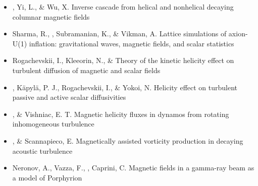 \begin{itemize}
\item[{468.}~]
\Brandenburg, Yi, L., \& Wu, X.
{Inverse cascade from helical and nonhelical decaying columnar magnetic fields}

\item[{467.}~]
Sharma, R., \Brandenburg, Subramanian, K., \& Vikman, A.
{Lattice simulations of axion-U(1) inflation: gravitational waves, magnetic fields, and scalar statistics}

\item[{466.}~]
Rogachevskii, I., Kleeorin, N., \& \Brandenburg{}
{Theory of the kinetic helicity effect on turbulent diffusion of magnetic and scalar fields}

\item[{465.}~]
\Brandenburg, K\"apyl\"a, P. J., Rogachevskii, I., \& Yokoi, N.
{Helicity effect on turbulent passive and active scalar diffusivities}

\item[{464.}~]
\Brandenburg, \& Vishniac, E. T.
{Magnetic helicity fluxes in dynamos from rotating inhomogeneous turbulence}

\item[{463.}~]
\Brandenburg, \& Scannapieco, E.
{Magnetically assisted vorticity production in decaying acoustic turbulence}

\item[{462.}~]
Neronov, A., Vazza, F., \Brandenburg, Caprini, C.
{Magnetic fields in a gamma-ray beam as a model of Porphyrion}


\end{itemize}
